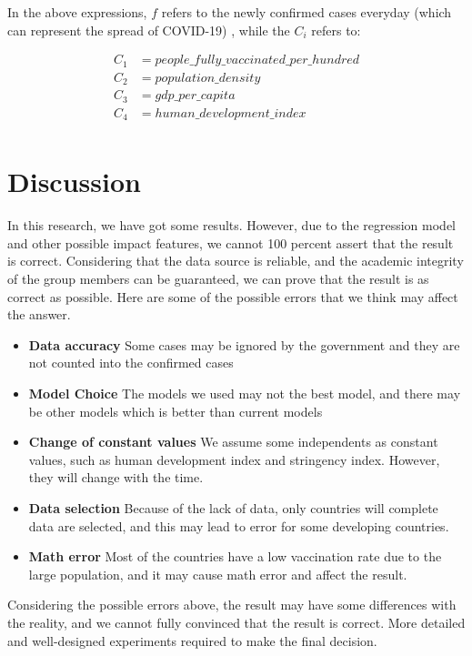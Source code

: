 \documentclass{article}
\begin{document}
\begin{multicols}{2}
In the above expressions, $f$ refers to the newly confirmed cases everyday (which can represent the spread of COVID-19) , while the $C_i$ refers to:

\begin{align*}
    C_1&=people\_fully\_vaccinated\_per\_hundred \\
    C_2&=population\_density \\
    C_3&=gdp\_per\_capita \\
    C_4&=human\_development\_index\\
\end{align*}

\section{Discussion}

In this research, we have got some results. However, due to the regression model and other possible impact features, we cannot 100 percent assert that the result is correct. Considering that the data source is reliable, and the academic integrity of the group members can be guaranteed, we can prove that the result is as correct as possible. Here are some of the possible errors that we think may affect the answer.

\begin{itemize}
    \item \textbf{Data accuracy} Some cases may be ignored by the government and they are not counted into the confirmed cases
    \item \textbf{Model Choice} The models we used may not the best model, and there may be other models which is better than current models
    \item \textbf{Change of constant values} We assume some independents as constant values, such as human development index and stringency index. However, they will change with the time.
    \item \textbf{Data selection} Because of the lack of data, only countries will complete data are selected, and this may lead to error for some developing countries.
    \item \textbf{Math error} Most of the countries have a low vaccination rate due to the large population, and it may cause math error and affect the result.
\end{itemize}

Considering the possible errors above, the result may have some differences with the reality, and we cannot fully convinced that the result is correct. More detailed and well-designed experiments required to make the final decision.

\end{multicols}
\end{document}
